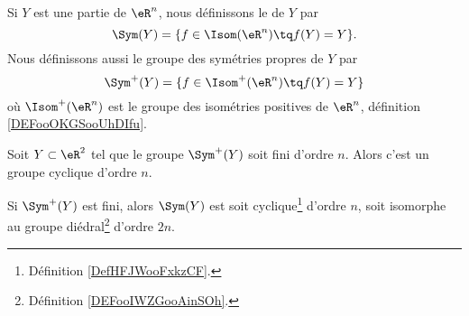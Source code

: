 \begin{definition}
	Si \( Y\) est une partie de \( \eR^n\), nous définissons le  de \( Y\) par
	\begin{equation}
		\Sym(Y)=\{ f\in\Isom(\eR^n)\tq f(Y)=Y \}.
	\end{equation}
	Nous définissons aussi le groupe des symétries propres de \( Y\) par
	\begin{equation}
		\Sym^+(Y)=\{ f\in\Isom^+(\eR^n)\tq f(Y)=Y \}
	\end{equation}
    où \( \Isom^+(\eR^n)\) est le groupe des isométries positives de \( \eR^n\), définition \ref{DEFooOKGSooUhDIfu}.
\end{definition}

\begin{theorem}      \label{THOooAYZVooPmCiWI}
	Soit \( Y\subset \eR^2\) tel que le groupe \( \Sym^+(Y)\) soit fini d'ordre \( n\). Alors c'est un groupe cyclique d'ordre \( n\).

	Si \( \Sym^+(Y)\) est fini, alors \( \Sym(Y)\) est soit cyclique\footnote{Définition \ref{DefHFJWooFxkzCF}.} d'ordre \( n\), soit isomorphe au groupe diédral\footnote{Définition \ref{DEFooIWZGooAinSOh}.} d'ordre \( 2n\).
\end{theorem}

